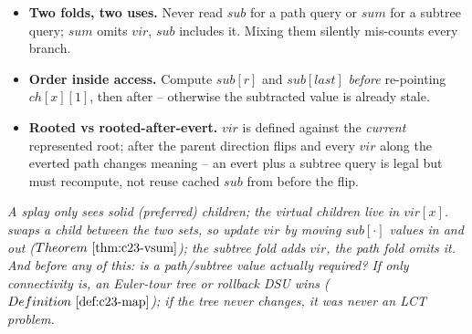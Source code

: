 \begin{hardeningbox}
\begin{itemize}[nosep,leftmargin=1.4em]
  \item \textbf{Two folds, two uses.} Never read \(\mathit{sub}\) for a path query or
        \(\mathit{sum}\) for a subtree query; \(\mathit{sum}\) omits \(\mathit{vir}\),
        \(\mathit{sub}\) includes it. Mixing them silently mis-counts every branch.
  \item \textbf{Order inside access.} Compute \(\mathit{sub}[r]\) and
        \(\mathit{sub}[\mathit{last}]\) \emph{before} re-pointing \(\mathit{ch}[x][1]\),
        then  after -- otherwise the subtracted value is already stale.
  \item \textbf{Rooted vs rooted-after-evert.} \(\mathit{vir}\) is defined against the
        \emph{current} represented root; after  the parent direction
        flips and every \(\mathit{vir}\) along the everted path changes meaning -- an
        evert plus a subtree query is legal but must recompute, not reuse cached
        \(\mathit{sub}\) from before the flip.
\end{itemize}
\end{hardeningbox}

\begin{recallbox}
\emph{A splay only sees solid (preferred) children; the virtual children live in
\(\mathit{vir}[x]\).  swaps a child between the two sets, so update
\(\mathit{vir}\) by moving \(\mathit{sub}[\cdot]\) values in and out
(\(\thmref{c23-vsum}\)); the subtree fold adds \(\mathit{vir}\), the path fold omits it.
And before any of this: is a path/subtree value actually required? If only
connectivity is, an Euler-tour tree or rollback DSU wins (\(\defref{c23-map}\)); if
the tree never changes, it was never an LCT problem.}
\end{recallbox}
